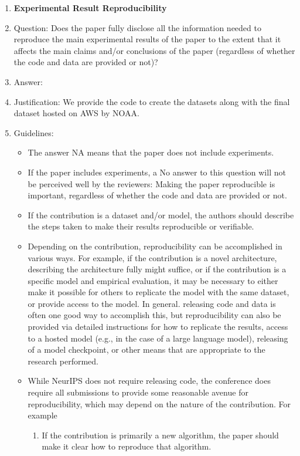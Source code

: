 \documentclass{article}
\begin{document}
\begin{enumerate}
    \item {\bf Experimental Result Reproducibility}
    \item[] Question: Does the paper fully disclose all the information needed to reproduce the main experimental results of the paper to the extent that it affects the main claims and/or conclusions of the paper (regardless of whether the code and data are provided or not)?
    \item[] Answer: \answerYes{} %
    \item[] Justification: We provide the code to create the datasets along with the final dataset hosted on AWS by NOAA.
    \item[] Guidelines:
    \begin{itemize}
        \item The answer NA means that the paper does not include experiments.
        \item If the paper includes experiments, a No answer to this question will not be perceived well by the reviewers: Making the paper reproducible is important, regardless of whether the code and data are provided or not.
        \item If the contribution is a dataset and/or model, the authors should describe the steps taken to make their results reproducible or verifiable. 
        \item Depending on the contribution, reproducibility can be accomplished in various ways. For example, if the contribution is a novel architecture, describing the architecture fully might suffice, or if the contribution is a specific model and empirical evaluation, it may be necessary to either make it possible for others to replicate the model with the same dataset, or provide access to the model. In general. releasing code and data is often one good way to accomplish this, but reproducibility can also be provided via detailed instructions for how to replicate the results, access to a hosted model (e.g., in the case of a large language model), releasing of a model checkpoint, or other means that are appropriate to the research performed.
        \item While NeurIPS does not require releasing code, the conference does require all submissions to provide some reasonable avenue for reproducibility, which may depend on the nature of the contribution. For example
        \begin{enumerate}
            \item If the contribution is primarily a new algorithm, the paper should make it clear how to reproduce that algorithm.

\end{enumerate}
\end{itemize}
\end{enumerate}
\end{document}
